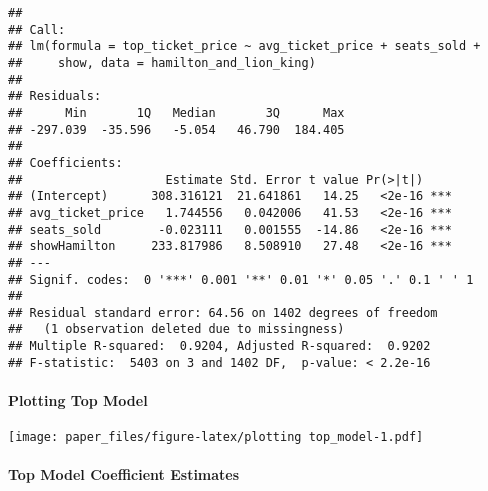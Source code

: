 \documentclass[
]{article}
\begin{document}
\begin{verbatim}
## 
## Call:
## lm(formula = top_ticket_price ~ avg_ticket_price + seats_sold + 
##     show, data = hamilton_and_lion_king)
## 
## Residuals:
##      Min       1Q   Median       3Q      Max 
## -297.039  -35.596   -5.054   46.790  184.405 
## 
## Coefficients:
##                    Estimate Std. Error t value Pr(>|t|)    
## (Intercept)      308.316121  21.641861   14.25   <2e-16 ***
## avg_ticket_price   1.744556   0.042006   41.53   <2e-16 ***
## seats_sold        -0.023111   0.001555  -14.86   <2e-16 ***
## showHamilton     233.817986   8.508910   27.48   <2e-16 ***
## ---
## Signif. codes:  0 '***' 0.001 '**' 0.01 '*' 0.05 '.' 0.1 ' ' 1
## 
## Residual standard error: 64.56 on 1402 degrees of freedom
##   (1 observation deleted due to missingness)
## Multiple R-squared:  0.9204, Adjusted R-squared:  0.9202 
## F-statistic:  5403 on 3 and 1402 DF,  p-value: < 2.2e-16
\end{verbatim}

\hypertarget{plotting-top-model}{%
\paragraph{Plotting Top Model}\label{plotting-top-model}}

\texttt{[image: paper\_files/figure-latex/plotting top\_model-1.pdf]}

\hypertarget{top-model-coefficient-estimates}{%
\paragraph{Top Model Coefficient Estimates}\label{top-model-coefficient-estimates}}

 
  \providecommand{\huxb}[2]{\arrayrulecolor[RGB]{#1}\global\arrayrulewidth=#2pt}
  \providecommand{\huxvb}[2]{\color[RGB]{#1}\vrule width #2pt}
  \providecommand{\huxtpad}[1]{\rule{0pt}{#1}}
  \providecommand{\huxbpad}[1]{\rule[-#1]{0pt}{#1}}
\end{document}
